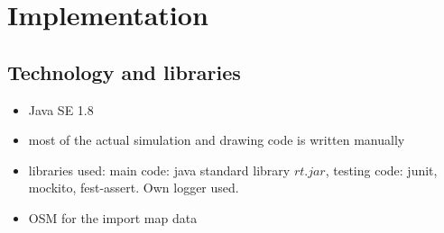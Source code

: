 

\section{Implementation}

\subsection{Technology and libraries}
\begin{itemize}
    \item Java SE 1.8
    \item most of the actual simulation and drawing code is written manually
    \item libraries used: main code: java standard library \(rt.jar\), testing code: junit, mockito, fest-assert. Own logger used.
    \item OSM for the import map data
\end{itemize}



